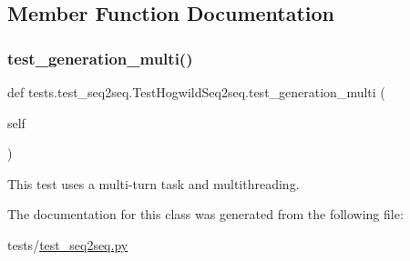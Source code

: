\subsection{Member Function Documentation}
\mbox{\label{classtests_1_1test__seq2seq_1_1TestHogwildSeq2seq_ae5d33c237b20de2e7bbe59058c181f38}} 
\subsubsection{\texorpdfstring{test\+\_\+generation\+\_\+multi()}{test\_generation\_multi()}}
{\footnotesize\ttfamily def tests.\+test\+\_\+seq2seq.\+Test\+Hogwild\+Seq2seq.\+test\+\_\+generation\+\_\+multi (\begin{DoxyParamCaption}\item[{}]{self }\end{DoxyParamCaption})}

\begin{DoxyVerb}This test uses a multi-turn task and multithreading.
\end{DoxyVerb}
 

The documentation for this class was generated from the following file\+:\begin{DoxyCompactItemize}
\item 
tests/\hyperlink{test__seq2seq_8py}{test\+\_\+seq2seq.\+py}\end{DoxyCompactItemize}
